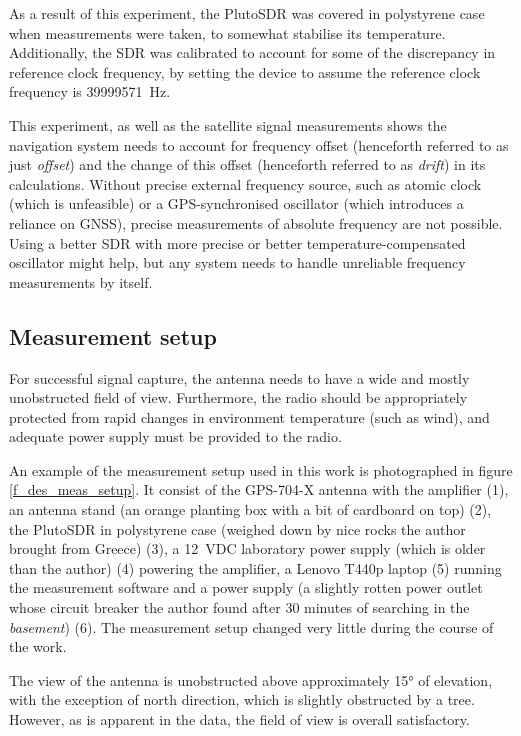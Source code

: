 As a result of this experiment, the PlutoSDR was covered in polystyrene case when measurements were taken, to somewhat stabilise its temperature. Additionally, the SDR was calibrated to account for some of the discrepancy in reference clock frequency, by setting the device to assume the reference clock frequency is \qty{39999571}{Hz}.

This experiment, as well as the satellite signal measurements shows the navigation system needs to account for frequency offset (henceforth referred to as just \textit{offset}) and the change of this offset (henceforth referred to as \textit{drift}) in its calculations. Without precise external frequency source, such as atomic clock (which is unfeasible) or a GPS-synchronised oscillator (which introduces a reliance on GNSS), precise measurements of absolute frequency are not possible. Using a better SDR with more precise or better temperature-compensated oscillator might help, but any system needs to handle unreliable frequency measurements by itself.

\subsection{Measurement setup}
For successful signal capture, the antenna needs to have a wide and mostly unobstructed field of view. Furthermore, the radio should be appropriately protected from rapid changes in environment temperature (such as wind), and adequate power supply must be provided to the radio.

An example of the measurement setup used in this work is photographed in figure \ref{f_des_meas_setup}. It consist of the GPS-704-X antenna with the amplifier (1), an antenna stand (an orange planting box with a bit of cardboard on top) (2), the PlutoSDR in polystyrene case (weighed down by nice rocks the author brought from Greece) (3), a \qty{12}{VDC} laboratory power supply (which is older than the author) (4) powering the amplifier, a Lenovo T440p laptop (5) running the measurement software and a power supply (a slightly rotten power outlet whose circuit breaker the author found after 30 minutes of searching in the \textit{basement}) (6). The measurement setup changed very little during the course of the work.

The view of the antenna is unobstructed above approximately \ang{15} of elevation, with the exception of north direction, which is slightly obstructed by a tree. However, as is apparent in the data, the field of view is overall satisfactory.

